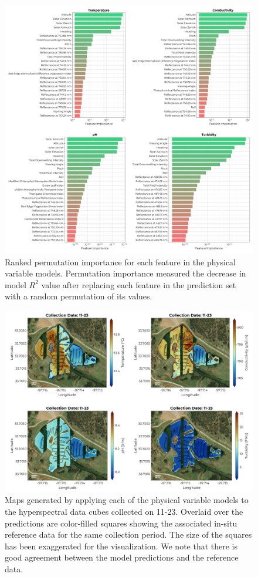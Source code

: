 \documentclass[remotesensing,article,submit,pdftex,moreauthors]{Definitions/mdpi}
\begin{document}
\begin{figure}[h!]
\centering
\includegraphics[width=\columnwidth]{paper/figures/results/fits/physical-ranking.pdf}
\caption{Ranked permutation importance for each feature in the physical variable models. Permutation importance measured the decrease in model $R^2$ value after replacing each feature in the prediction set with a random permutation of its values.\label{fig:physical-fi}}
\end{figure}  


\begin{figure}[h!]
\centering
\includegraphics[width=0.9\columnwidth]{paper/figures/results/maps/physical.pdf}
\caption{Maps generated by applying each of the physical variable models to the hyperspectral data cubes collected on 11-23. Overlaid over the predictions are color-filled squares showing the associated in-situ reference data for the same collection period. The size of the squares has been exaggerated for the visualization. We note that there is good agreement between the model predictions and the reference data. \label{fig:map-physical}}
\end{figure}  
\end{document}
